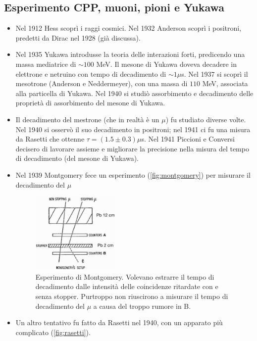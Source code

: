 \subsection{Esperimento CPP, muoni, pioni e Yukawa}
\begin{itemize}
    \item Nel 1912 Hess scoprì i raggi cosmici. Nel 1932 Anderson scoprì i positroni, predetti da Dirac nel 1928 (già discussa).
    \item Nel 1935 Yukawa introdusse la teoria delle interazioni forti, predicendo una massa mediatrice di $\sim 100$ MeV. Il mesone di Yukawa doveva decadere in elettrone e netruino con tempo di decadimento di $\sim1\mu$s. Nel 1937 si scoprì il mesotrone (Anderson e Neddermeyer), con una massa di $110$ MeV, associata alla particella di Yukawa. Nel 1940 si studiò assorbimento e decadimento delle proprietà di assorbimento del mesone di Yukawa.
    \item Il decadimento del mestrone (che in realtà è un $\mu$) fu studiato diverse volte. Nel 1940 si osservò il suo decadimento in positroni; nel 1941 ci fu una misura da Rasetti che ottenne $\tau=(1.5\pm0.3)\mu$s. Nel 1941 Piccioni e Conversi decisero di lavorare assieme e migliorare la precisione nella misura del tempo di decadimento (del mesone di Yukawa).
    \item Nel 1939 Montgomery fece un esperimento (\autoref{fig:montgomery}) per misurare il decadimento del $\mu$
    \begin{figure}[h]
        \centering
        \includegraphics[width=0.4\textwidth]{immagini/fig_montgomery.png}
        \caption{Esperimento di Montgomery. Volevano estrarre il tempo di decadimento dalle intensità delle coincidenze ritardate con e senza stopper. Purtroppo non riuscirono a misurare il tempo di decadimento del $\mu$ a causa del troppo rumore in B.}
        \label{fig:montgomery}
    \end{figure}
    \item Un altro tentativo fu fatto da Rasetti nel 1940, con un apparato più complicato (\autoref{fig:rasetti}).

\end{itemize}

